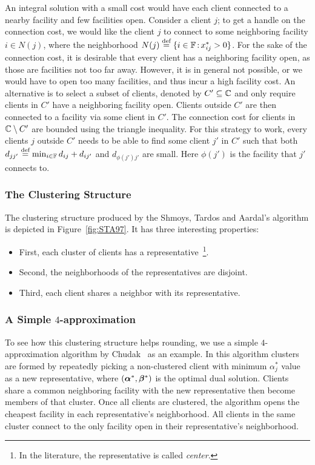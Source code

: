 \documentclass[oneside,final]{ucr}
\begin{document}
An integral solution with a small cost would have each
client connected to a nearby facility and few facilities
open. Consider a client $j$; to get a handle on the
connection cost, we would like the client $j$ to connect to
some neighboring facility $i\in N(j)$, where the
neighborhood $N(j) \stackrel{\text{def}}{=} \{i\in\mathbb{F} {\,:\,}
x_{ij}^\ast > 0\}$. For the sake of the connection cost, it
is desirable that every client has a neighboring facility
open, as those are facilities not too far away. However, it
is in general not possible, or we would have to open too
many facilities, and thus incur a high facility cost. An
alternative is to select a subset of clients, denoted by $C'
\subseteq \mathbb{C}$ and only require clients in $C'$ have
a neighboring facility open. Clients outside $C'$ are then
connected to a facility via some client in $C'$. The
connection cost for clients in $\mathbb{C} \setminus C'$ are
bounded using the triangle inequality. For this strategy to
work, every clients $j$ outside $C'$ needs to be able to
find some client $j'$ in $C'$ such that both $d_{jj'} \stackrel{\text{def}}{=}
\min_{i\in \mathbb{F}} d_{ij} + d_{ij'}$ and $d_{\phi(j')
  j'}$ are small. Here $\phi(j')$ is the facility that $j'$
connects to.

\subsubsection{The Clustering Structure}
The clustering structure produced by the Shmoys, Tardos and
Aardal's algorithm is depicted in Figure~\ref{fig:STA97}. It
has three interesting properties:
\begin{itemize}
\item First, each cluster of clients has a
  representative~\footnote{In the literature, the
    representative is called \emph{center}.}.
\item Second, the neighborhoods of the representatives are
  disjoint.
\item Third, each client shares a neighbor with its
  representative.
\end{itemize}

\subsubsection{A Simple $4$-approximation}
To see how this clustering structure helps rounding, we use
a simple $4$-approximation algorithm by
Chudak~\cite{Chudak98} as an example. In this algorithm
clusters are formed by repeatedly picking a non-clustered
client with minimum $\alpha_j^\ast$ value as a new
representative, where $(\boldsymbol{\alpha}^\ast,\boldsymbol{\beta}^\ast)$ is the
optimal dual solution. Clients share a common neighboring
facility with the new representative then become members of
that cluster. Once all clients are clustered, the algorithm
opens the cheapest facility in each representative's
neighborhood. All clients in the same cluster connect to the
only facility open in their representative's neighborhood.
\end{document}
